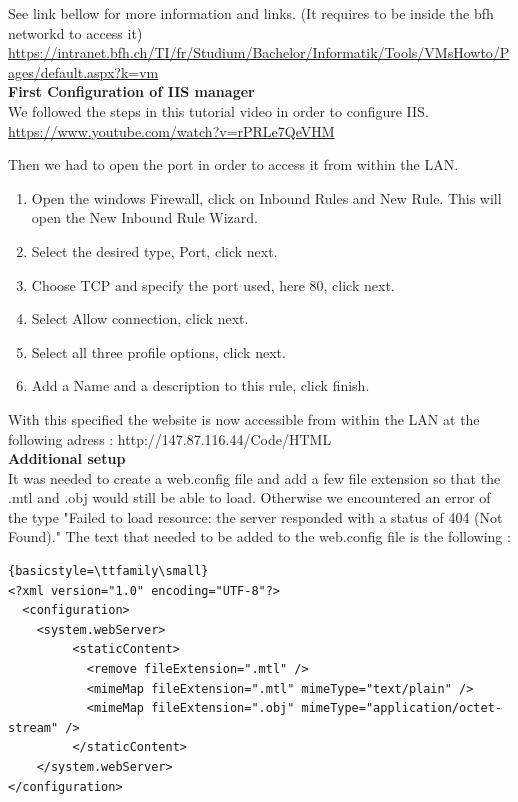 \documentclass{scrartcl}
\begin{document}
See link bellow for more information and links. (It requires to be inside the bfh networkd to access it)
\url{https://intranet.bfh.ch/TI/fr/Studium/Bachelor/Informatik/Tools/VMsHowto/Pages/default.aspx?k=vm}\\

\textbf{First Configuration of IIS manager}\\

We followed the steps in this tutorial video in order to configure IIS. \url{https://www.youtube.com/watch?v=rPRLe7QeVHM}

Then we had to open the port in order to access it from within the LAN.
\begin{enumerate}
  \item Open the windows Firewall, click on Inbound Rules and New Rule. This will open the New Inbound Rule Wizard.
  \item Select the desired type, Port, click next.
  \item Choose TCP and specify the port used, here 80, click next.
  \item Select Allow connection, click next.
  \item Select all three profile options, click next.
  \item Add a Name and a description to this rule, click finish.
\end{enumerate}

With this specified the website is now accessible from within the LAN at the following adress : http://147.87.116.44/Code/HTML \\

\textbf{Additional setup}\\

It was needed to create a web.config file and add a few file extension so that the .mtl and .obj would still be able to load. 
Otherwise we encountered an error of the type "Failed to load resource: the server responded with a status of 404 (Not Found)." 
The text that needed to be added to the web.config file is the following : \\
\lstset{language=XML}
\begin{lstlisting}{basicstyle=\ttfamily\small}
<?xml version="1.0" encoding="UTF-8"?>
  <configuration>
    <system.webServer>
         <staticContent>
           <remove fileExtension=".mtl" />
           <mimeMap fileExtension=".mtl" mimeType="text/plain" />
           <mimeMap fileExtension=".obj" mimeType="application/octet-stream" />
         </staticContent>
    </system.webServer>
</configuration>
\end{lstlisting}
\end{document}

